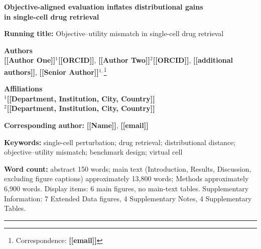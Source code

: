 \documentclass[11pt,letterpaper]{article}
\newcommand{\TODO}[1]{{\color{BrickRed}\textbf{[[#1]]}}}
\begin{document}
\thispagestyle{empty}
\begin{flushleft}

{\LARGE\bfseries Objective-aligned evaluation inflates distributional gains\\[2pt]
in single-cell drug retrieval\par}

\bigskip
\noindent\textbf{Running title:} Objective--utility mismatch in single-cell drug retrieval

\bigskip
\noindent\textbf{Authors}\\
\TODO{Author One}$^{1}$\TODO{ORCID}, \TODO{Author Two}$^{2}$\TODO{ORCID}, \TODO{additional authors}, \TODO{Senior Author}$^{1,}$\footnote{Correspondence: \TODO{email}}

\medskip
\noindent\textbf{Affiliations}\\
$^{1}$\TODO{Department, Institution, City, Country}\\
$^{2}$\TODO{Department, Institution, City, Country}

\medskip
\noindent\textbf{Corresponding author:} \TODO{Name}, \TODO{email}

\bigskip
\noindent\textbf{Keywords:} single-cell perturbation; drug retrieval; distributional distance;
objective--utility mismatch; benchmark design; virtual cell

\bigskip
\noindent\textbf{Word count:} abstract 150 words; main text (Introduction, Results, Discussion,
excluding figure captions) approximately 13{,}800 words; Methods approximately 6{,}900 words. Display items: 6 main
figures, no main-text tables. Supplementary Information: 7 Extended Data figures, 4 Supplementary
Notes, 4 Supplementary Tables.

\end{flushleft}

\vfill
\noindent\rule{\textwidth}{0.4pt}

\clearpage
\end{document}
